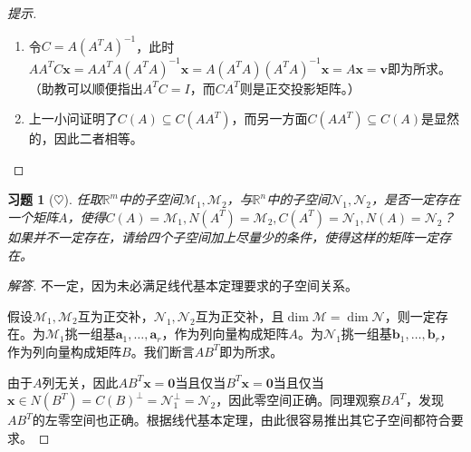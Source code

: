 \documentclass[UTF8]{ctexart}
\newcommand{\Ker}{N}
\newcommand{\nullspace}{N}
\newtheorem{ex}[thm]{习题}
\begin{document}
\begin{proof}[提示]
\begin{enumerate}
\item 令$C=A(A^TA)^{-1}$，此时$AA^TC\bm x=AA^TA(A^TA)^{-1}\bm x=A(A^TA)(A^TA)^{-1}\bm x=A\bm x=\bm v$即为所求。（助教可以顺便指出$A^TC=I$，而$CA^T$则是正交投影矩阵。）
\item 上一小问证明了$C(A)\subseteq C(AA^T)$，而另一方面$C(AA^T)\subseteq C(A)$是显然的，因此二者相等。
\end{enumerate}
\end{proof}




\begin{ex}[$\heartsuit $]
任取$\mathbb{R}^m$中的子空间$\mathcal{M}_1,\mathcal{M}_2$，与$\mathbb{R}^n$中的子空间$\mathcal{N}_1,\mathcal{N}_2$，是否一定存在一个矩阵$A$，使得$C(A)=\mathcal{M}_1,\nullspace(A^{T})=\mathcal{M}_2, C(A^{T})=\mathcal{N}_1,\nullspace(A)=\mathcal{N}_2$？如果并不一定存在，请给四个子空间加上尽量少的条件，使得这样的矩阵一定存在。
\end{ex}

\begin{proof}[解答]
不一定，因为未必满足线代基本定理要求的子空间关系。

假设$\mathcal{M}_1,\mathcal{M}_2$互为正交补，$\mathcal{N}_1,\mathcal{N}_2$互为正交补，且$\dim\mathcal{M}=\dim\mathcal{N}$，则一定存在。为$\mathcal{M}_1$挑一组基$\bm a_1,\dots,\bm a_r$，作为列向量构成矩阵$A$。为$\mathcal{N}_1$挑一组基$\bm b_1,\dots,\bm b_r$，作为列向量构成矩阵$B$。我们断言$AB^T$即为所求。

由于$A$列无关，因此$AB^T\bm x=\bm 0$当且仅当$B^T\bm x=\bm 0$当且仅当$\bm x\in\Ker(B^T)=C(B)^\perp=\mathcal{N}_1^\perp=\mathcal{N}_2$，因此零空间正确。同理观察$BA^T$，发现$AB^T$的左零空间也正确。根据线代基本定理，由此很容易推出其它子空间都符合要求。
\end{proof}
\end{document}
